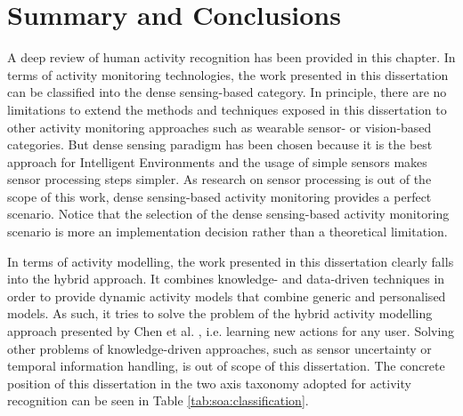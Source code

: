 \section{Summary and Conclusions}
\label{sec:soa:summary}


A deep review of human activity recognition has been provided in this chapter. In terms of activity monitoring technologies, the work presented in this dissertation can be classified into the dense sensing-based category. In principle, there are no limitations to extend the methods and techniques exposed in this dissertation to other activity monitoring approaches such as wearable sensor- or vision-based categories. But dense sensing paradigm has been chosen because it is the best approach for Intelligent Environments and the usage of simple sensors makes sensor processing steps simpler. As research on sensor processing is out of the scope of this work, dense sensing-based activity monitoring provides a perfect scenario. Notice that the selection of the dense sensing-based activity monitoring scenario is more an implementation decision rather than a theoretical limitation.

In terms of activity modelling, the work presented in this dissertation clearly falls into the hybrid approach. It combines knowledge- and data-driven techniques in order to provide dynamic activity models that combine generic and personalised models. As such, it tries to solve the problem of the hybrid activity modelling approach presented by Chen et al. \cite{Chen2014}, i.e. learning new actions for any user. Solving other problems of knowledge-driven approaches, such as sensor uncertainty or temporal information handling, is out of scope of this dissertation. The concrete position of this dissertation in the two axis taxonomy adopted for activity recognition can be seen in Table \ref{tab:soa:classification}.

